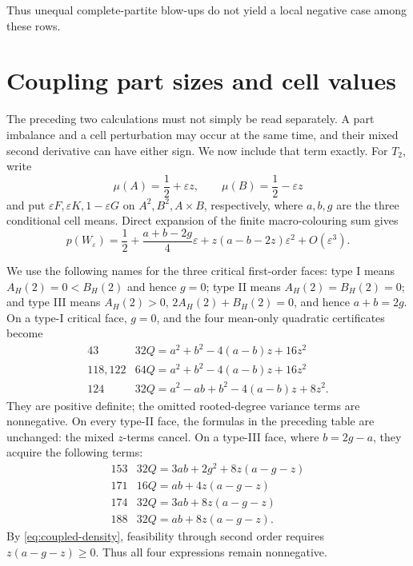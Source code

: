 \documentclass[11pt]{article}
\begin{document}
Thus unequal complete-partite blow-ups do not yield a local negative case
among these rows.


\section{Coupling part sizes and cell values}

The preceding two calculations must not simply be read separately.  A part
imbalance and a cell perturbation may occur at the same time, and their mixed
second derivative can have either sign.  We now include that term exactly.
For $T_2$, write
\[
 \mu(A)=\frac12+\varepsilon z,\qquad
 \mu(B)=\frac12-\varepsilon z
\]
and put $\varepsilon F,\varepsilon K,1-\varepsilon G$ on
$A^2,B^2,A\times B$, respectively, where $a,b,g$ are the three conditional
cell means.  Direct expansion of the finite macro-colouring sum gives
\begin{equation}
 p(W_\varepsilon)
 =\frac12+\frac{a+b-2g}{4}\varepsilon
  +z(a-b-2z)\varepsilon^2+O(\varepsilon^3).
 \label{eq:coupled-density}
\end{equation}

We use the following names for the three critical first-order faces:
type I means $A_H(2)=0<B_H(2)$ and hence $g=0$; type II means
$A_H(2)=B_H(2)=0$; and type III means
$A_H(2)>0$, $2A_H(2)+B_H(2)=0$, and hence $a+b=2g$.
On a type-I critical face, $g=0$, and the four mean-only quadratic
certificates become
\[
\begin{array}{c|l}
43&32Q=a^2+b^2-4(a-b)z+16z^2\\
118,122&64Q=a^2+b^2-4(a-b)z+16z^2\\
124&32Q=a^2-ab+b^2-4(a-b)z+8z^2.
\end{array}
\]
They are positive definite; the omitted rooted-degree variance terms are
nonnegative.  On every type-II face, the formulas in the preceding table are
unchanged: the mixed $z$-terms cancel.  On a type-III face, where $b=2g-a$,
they acquire the following terms:
\[
\begin{array}{c|l}
153&32Q=3ab+2g^2+8z(a-g-z)\\
171&16Q=ab+4z(a-g-z)\\
174&32Q=3ab+8z(a-g-z)\\
188&32Q=ab+8z(a-g-z).
\end{array}
\]
By \eqref{eq:coupled-density}, feasibility through second order requires
$z(a-g-z)\geq0$.  Thus all four expressions remain nonnegative.
\end{document}
